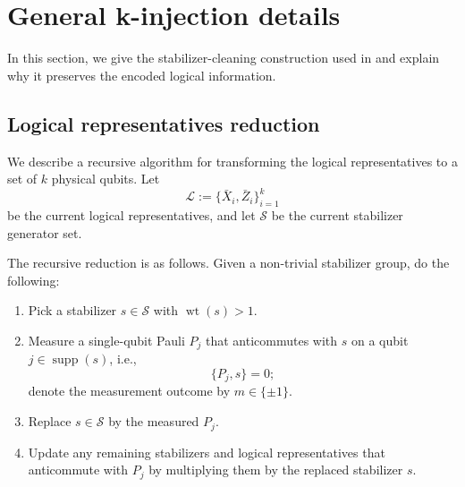 \section{General k-injection details}
\label{app:k-injection-details}

In this section, we give the stabilizer-cleaning construction used in  and explain why it preserves the encoded logical information.

\subsection{Logical representatives reduction}
We describe a recursive algorithm for transforming the logical representatives to a set of $ k $ physical qubits.
Let
\begin{equation}
\mathcal{L} := \{ \bar{X}_i, \bar{Z}_i \}_{i=1}^{k}
\label{eq:tomas-current-logical-basis}
\end{equation}
be the current logical representatives, and let $\mathcal{S}$ be the current stabilizer generator
set.

The recursive reduction is as follows. Given a non-trivial stabilizer group, 
do the following:
\begin{enumerate}
    \item Pick a stabilizer $s \in \mathcal{S}$ with $\operatorname{wt}(s) > 1$.
    \item Measure a single-qubit Pauli $P_j$ that anticommutes with $s$ on a qubit $j \in \operatorname{supp}(s)$, i.e.,
    \begin{equation}
    \{ P_j, s \} = 0;
    \label{eq:tomas-step-anticommute}
    \end{equation} denote the measurement outcome by $m \in \{ \pm 1 \}$.
    \item Replace $s \in \mathcal{S}$ by the measured $P_j$.
    \item Update any remaining stabilizers and logical representatives that
    anticommute with $P_j$ by multiplying them by the replaced stabilizer $s$.
\end{enumerate}

